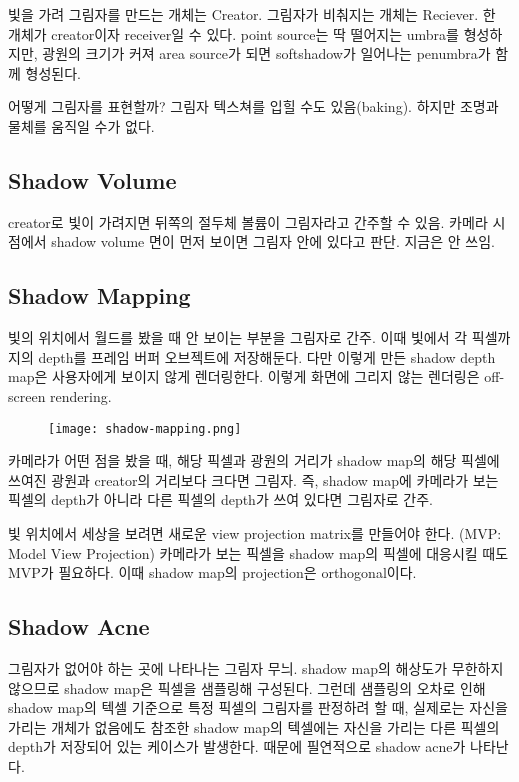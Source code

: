 빛을 가려 그림자를 만드는 개체는 Creator. 그림자가 비춰지는 개체는 Reciever. 한 개체가 creator이자 receiver일 수 있다. point source는 딱 떨어지는 umbra를 형성하지만, 광원의 크기가 커져 area source가 되면 softshadow가 일어나는 penumbra가 함께 형성된다.

어떻게 그림자를 표현할까? 그림자 텍스쳐를 입힐 수도 있음(baking). 하지만 조명과 물체를 움직일 수가 없다.

\subsection{Shadow Volume}

creator로 빛이 가려지면 뒤쪽의 절두체 볼륨이 그림자라고 간주할 수 있음. 카메라 시점에서 shadow volume 면이 먼저 보이면 그림자 안에 있다고 판단. 지금은 안 쓰임.

\subsection{Shadow Mapping}

빛의 위치에서 월드를 봤을 때 안 보이는 부분을 그림자로 간주. 이때 빛에서 각 픽셀까지의 depth를 프레임 버퍼 오브젝트에 저장해둔다. 다만 이렇게 만든 shadow depth map은 사용자에게 보이지 않게 렌더링한다. 이렇게 화면에 그리지 않는 렌더링은 off-screen rendering.

\begin{figure}[h]
  \centering
  \texttt{[image: shadow-mapping.png]}
\end{figure}

카메라가 어떤 점을 봤을 때, 해당 픽셀과 광원의 거리가 shadow map의 해당 픽셀에 쓰여진 광원과 creator의 거리보다 크다면 그림자. 즉, shadow map에 카메라가 보는 픽셀의 depth가 아니라 다른 픽셀의 depth가 쓰여 있다면 그림자로 간주.

빛 위치에서 세상을 보려면 새로운 view projection matrix를 만들어야 한다. (MVP: Model View Projection) 카메라가 보는 픽셀을 shadow map의 픽셀에 대응시킬 때도 MVP가 필요하다. 이때 shadow map의 projection은 orthogonal이다.

\subsection{Shadow Acne}

그림자가 없어야 하는 곳에 나타나는 그림자 무늬. shadow map의 해상도가 무한하지 않으므로 shadow map은 픽셀을 샘플링해 구성된다. 그런데 샘플링의 오차로 인해 shadow map의 텍셀 기준으로 특정 픽셀의 그림자를 판정하려 할 때, 실제로는 자신을 가리는 개체가 없음에도 참조한 shadow map의 텍셀에는 자신을 가리는 다른 픽셀의 depth가 저장되어 있는 케이스가 발생한다. 때문에 필연적으로 shadow acne가 나타난다.

